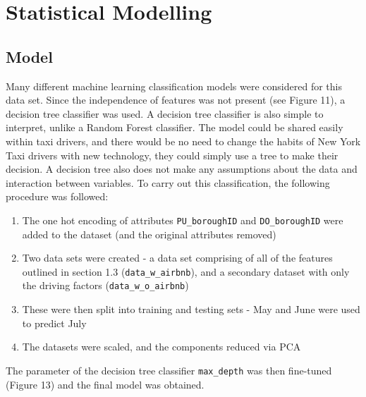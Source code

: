 \documentclass[11pt]{article}
\begin{document}
\section{Statistical Modelling}
\subsection{Model}

Many different machine learning classification models were considered for this data set. Since the independence of features was not present (see Figure 11), a decision tree classifier was used. A decision tree classifier is also simple to interpret, unlike a Random Forest classifier. The model could be shared easily within taxi drivers, and there would be no need to change the habits of New York Taxi drivers with new technology, they could simply use a tree to make their decision. A decision tree also does not make any assumptions about the data and interaction between variables. To carry out this classification, the following procedure was followed:
\begin{enumerate}
    \item The one hot encoding of attributes \verb|PU_boroughID| and \verb|DO_boroughID| were added to the dataset (and the original attributes removed)
    \item Two data sets were created - a data set comprising of all of the features outlined in section 1.3 (\verb|data_w_airbnb|), and a secondary dataset with only the driving factors (\verb|data_w_o_airbnb|)
    \item These were then split into training and testing sets - May and June were used to predict July
    \item The datasets were scaled, and the components reduced via PCA
\end{enumerate} 
The parameter of the decision tree classifier \verb|max_depth| was then fine-tuned (Figure 13) and the final model was obtained.
\end{document}
